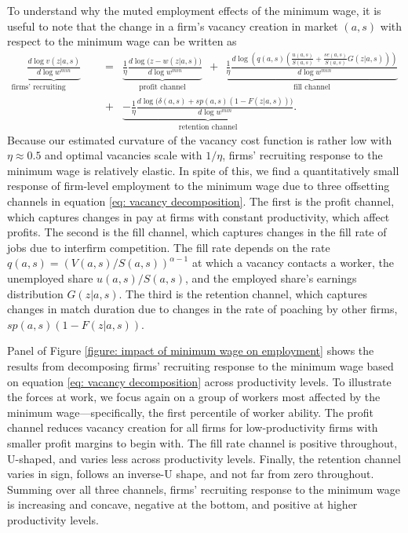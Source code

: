To understand why the muted employment effects of the minimum wage, it is useful to note that the change in a firm's vacancy creation in market $(a,s)$ with respect to the minimum wage can be written as
\begin{eqnarray}
  \underbrace{ \frac{d \log v(z|a,s)}{d \log w^{min}} }_{\text{firms' recruiting response}} &=& \underbrace{ \frac{1}{\eta} \frac{ d \log \Big(z-w(z|a,s)\Big)}{d \log w^{min}}}_{\text{profit channel}} \ \ + \ \ \underbrace{ \frac{1}{\eta} \frac{ d \log \left( q(a,s) \left( \frac{u(a,s)}{S(a,s)}+ \frac{s e(a,s)}{S(a,s)} G(z|a,s)\right) \right)}{d \log w^{min}} }_{\text{fill channel}}   \label{eq: vacancy decomposition} \\
  &+& \underbrace{ -\frac{1}{\eta} \frac{d{\log\Big(\delta(a,s)+sp(a,s)(1-F(z|a,s))\Big)}}{d \log w^{min}}}_{\text{retention channel}}. \nonumber
\end{eqnarray}
%
Because our estimated curvature of the vacancy cost function is rather low with $\eta \approx 0.5$ and optimal vacancies scale with $1/\eta$, firms' recruiting response to the minimum wage is relatively elastic. In spite of this, we find a quantitatively small response of firm-level employment to the minimum wage due to three offsetting channels in equation \eqref{eq: vacancy decomposition}. The first is the {profit channel}, which captures changes in pay at firms with constant productivity, which affect profits. The second is the {fill channel}, which captures changes in the fill rate of jobs due to interfirm competition. The fill rate depends on the rate $q(a,s)=(V(a,s)/S(a,s))^{\alpha-1}$ at which a vacancy contacts a worker, the unemployed share $u(a,s)/S(a,s)$, and the employed share's earnings distribution $G(z|a,s)$. The third is the {retention channel}, which captures changes in match duration due to changes in the rate of poaching by other firms, $sp(a,s)(1-F(z|a,s))$.

Panel  of Figure \ref{figure: impact of minimum wage on employment} shows the results from decomposing firms' recruiting response to the minimum wage based on equation \eqref{eq: vacancy decomposition} across productivity levels. To illustrate the forces at work, we focus again on a group of workers most affected by the minimum wage---specifically, the first percentile of worker ability. The profit channel reduces vacancy creation for all firms for low-productivity firms with smaller profit margins to begin with. The fill rate channel is positive throughout, U-shaped, and varies less across productivity levels. Finally, the retention channel varies in sign, follows an inverse-U shape, and not far from zero throughout. Summing over all three channels, firms' recruiting response to the minimum wage is increasing and concave, negative at the bottom, and positive at higher productivity levels.

